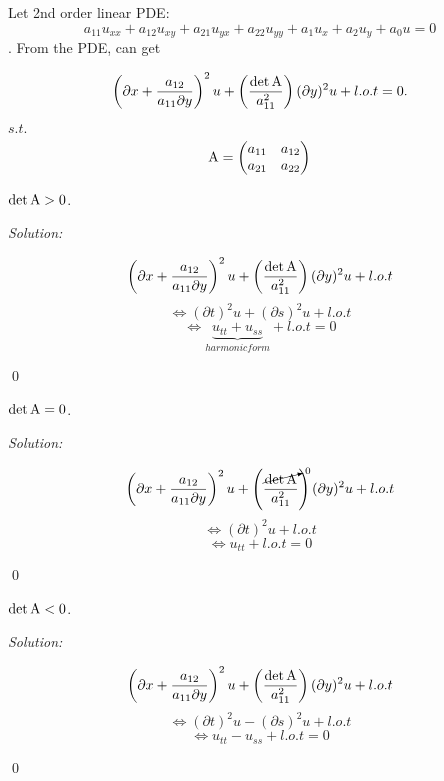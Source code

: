\documentclass[12pt]{article}
\theoremstyle{definition}
\newenvironment{case}[2][Case]{\begin{trivlist}
\item[\hskip \labelsep {\bfseries #1}\hskip \labelsep {\bfseries #2.}]}{\end{trivlist}}
\newenvironment{sol}
{\emph{Solution:}
}
{
    \qed
    }
\begin{document}




Let 2nd order linear PDE: $$a_{11}u_{xx} + a_{12}u_{xy} + a_{21}u_{yx} + a_{22}u_{yy} + a_{1}u_{x} + a_{2}u_{y} + a_{0}u = 0$$.
From the PDE, can get 

\begin{equation}
\left(\partial x + \frac{a_{12}}{a_{11} \partial y} \right)^2 u + \left( \frac{\det \rm{A}}{a_{11}^2} \right) (\partial y)^2 u + l.o.t = 0.
\end{equation}

$s.t.$
\begin{equation*}
    \rm{A} = 
    \begin{pmatrix}
    a_{11} & a_{12} \\
    a_{21} & a_{22} 
    \end{pmatrix}
\end{equation*}

\begin{case}{1}
    $\det \rm{A} > 0$.
\end{case}
\begin{sol}
    $$\left(\partial x + \frac{a_{12}}{a_{11} \partial y} \right)^2 u + \left( \frac{\det \rm{A}}{a_{11}^2} \right) (\partial y)^2 u + l.o.t$$
    $$\Leftrightarrow \left( \partial t \right)^2 u + \left( \partial s \right)^2 u + l.o.t$$
    $$\Leftrightarrow \underbrace{u_{tt} + u_{ss}}_{harmonic form} + l.o.t = 0$$
\end{sol}

\begin{case}{2}
    $\det \rm{A} = 0$.
\end{case}
\begin{sol}
    $$\left(\partial x + \frac{a_{12}}{a_{11} \partial y} \right)^2 u + \left( \frac{\cancelto{0}{\det \rm{A}}}{a_{11}^2} \right) (\partial y)^2 u + l.o.t$$
    $$\Leftrightarrow \left( \partial t \right)^2 u + l.o.t$$
    $$\Leftrightarrow u_{tt} + l.o.t = 0$$
\end{sol}

\begin{case}{3}
    $\det \rm{A} < 0$.
\end{case}
\begin{sol}
    $$\left(\partial x + \frac{a_{12}}{a_{11} \partial y} \right)^2 u + \left( \frac{\det \rm{A}}{a_{11}^2} \right) (\partial y)^2 u + l.o.t$$
    $$\Leftrightarrow \left( \partial t \right)^2 u -\left( \partial s \right)^2 u + l.o.t$$
    $$\Leftrightarrow u_{tt} -u_{ss} + l.o.t = 0$$
\end{sol}
\end{document}
